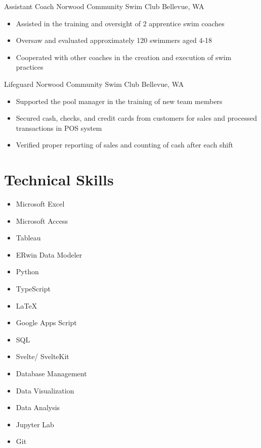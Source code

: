 \documentclass[10pt]{article}
\begin{document}
{Assistant Coach}
{Norwood Community Swim Club}
{Bellevue, WA}
{
    \begin{itemize}
        \item Assisted in the training and oversight of 2 apprentice swim coaches

        \item Oversaw and evaluated approximately 120 swimmers aged 4-18

        \item Cooperated with other coaches in the creation and execution of swim practices
    \end{itemize}
}

{Lifeguard}
{Norwood Community Swim Club}
{Bellevue, WA}
{
    \begin{itemize}
        \item Supported the pool manager in the training of new team members

        \item Secured cash, checks, and credit cards from customers for sales and processed transactions in POS system

        \item Verified proper reporting of sales and counting of cash after each shift
    \end{itemize}
}

\section{Technical Skills}
\begin{multicols}{4}
    \raggedright
    \begin{itemize}[leftmargin=3em]
        \item Microsoft Excel
        \item Microsoft Access
        \item Tableau
        \item ERwin Data Modeler
              \columnbreak
        \item Python
        \item TypeScript
        \item LaTeX
        \item Google Apps Script
              \columnbreak
        \item SQL
        \item Svelte/ SvelteKit
        \item Database Management
              \columnbreak
        \item Data Visualization
        \item Data Analysis
        \item Jupyter Lab
        \item Git
    \end{itemize}
\end{multicols}
\end{document}

